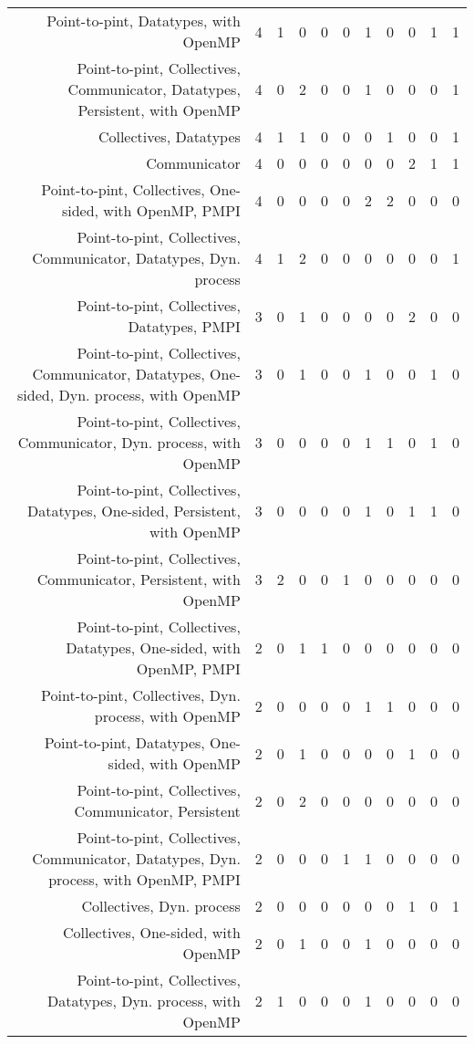 {\begin{landscape}
\begin{longtable}[htb]{r|c|c|c|c|c|c|c|c|c|c}
{Point-to-pint, Datatypes, with OpenMP} & 4 & 1 & 0 & 0 & 0 & 1 & 0 & 0 & 1 & 1 \\%
{Point-to-pint, Collectives, Communicator, Datatypes, Persistent, with OpenMP} & 4 & 0 & 2 & 0 & 0 & 1 & 0 & 0 & 0 & 1 \\%
{Collectives, Datatypes} & 4 & 1 & 1 & 0 & 0 & 0 & 1 & 0 & 0 & 1 \\%
{Communicator} & 4 & 0 & 0 & 0 & 0 & 0 & 0 & 2 & 1 & 1 \\%
{Point-to-pint, Collectives, One-sided, with OpenMP, PMPI} & 4 & 0 & 0 & 0 & 0 & 2 & 2 & 0 & 0 & 0 \\%
{Point-to-pint, Collectives, Communicator, Datatypes, Dyn. process} & 4 & 1 & 2 & 0 & 0 & 0 & 0 & 0 & 0 & 1 \\%
{Point-to-pint, Collectives, Datatypes, PMPI} & 3 & 0 & 1 & 0 & 0 & 0 & 0 & 2 & 0 & 0 \\%
{Point-to-pint, Collectives, Communicator, Datatypes, One-sided, Dyn. process, with OpenMP} & 3 & 0 & 1 & 0 & 0 & 1 & 0 & 0 & 1 & 0 \\%
{Point-to-pint, Collectives, Communicator, Dyn. process, with OpenMP} & 3 & 0 & 0 & 0 & 0 & 1 & 1 & 0 & 1 & 0 \\%
{Point-to-pint, Collectives, Datatypes, One-sided, Persistent, with OpenMP} & 3 & 0 & 0 & 0 & 0 & 1 & 0 & 1 & 1 & 0 \\%
{Point-to-pint, Collectives, Communicator, Persistent, with OpenMP} & 3 & 2 & 0 & 0 & 1 & 0 & 0 & 0 & 0 & 0 \\%
{Point-to-pint, Collectives, Datatypes, One-sided, with OpenMP, PMPI} & 2 & 0 & 1 & 1 & 0 & 0 & 0 & 0 & 0 & 0 \\%
{Point-to-pint, Collectives, Dyn. process, with OpenMP} & 2 & 0 & 0 & 0 & 0 & 1 & 1 & 0 & 0 & 0 \\%
{Point-to-pint, Datatypes, One-sided, with OpenMP} & 2 & 0 & 1 & 0 & 0 & 0 & 0 & 1 & 0 & 0 \\%
{Point-to-pint, Collectives, Communicator, Persistent} & 2 & 0 & 2 & 0 & 0 & 0 & 0 & 0 & 0 & 0 \\%
{Point-to-pint, Collectives, Communicator, Datatypes, Dyn. process, with OpenMP, PMPI} & 2 & 0 & 0 & 0 & 1 & 1 & 0 & 0 & 0 & 0 \\%
{Collectives, Dyn. process} & 2 & 0 & 0 & 0 & 0 & 0 & 0 & 1 & 0 & 1 \\%
{Collectives, One-sided, with OpenMP} & 2 & 0 & 1 & 0 & 0 & 1 & 0 & 0 & 0 & 0 \\%
{Point-to-pint, Collectives, Datatypes, Dyn. process, with OpenMP} & 2 & 1 & 0 & 0 & 0 & 1 & 0 & 0 & 0 & 0 \\%

\end{longtable}
\end{landscape}}
